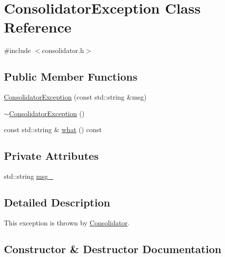 \hypertarget{classConsolidatorException}{}\section{Consolidator\+Exception Class Reference}
\label{classConsolidatorException}


{\ttfamily \#include $<$consolidator.\+h$>$}

\subsection*{Public Member Functions}
\begin{DoxyCompactItemize}
\item 
\hyperlink{classConsolidatorException_aeb4500538a2c9c0b477b8f95d4d2810f}{Consolidator\+Exception} (const std\+::string \&msg)
\item 
\hyperlink{classConsolidatorException_a1a50a013623fab20faf476e2176fc86f}{$\sim$\+Consolidator\+Exception} ()
\item 
const std\+::string \& \hyperlink{classConsolidatorException_a83d8bcbbdeb3a9facf80012f0cb6f0da}{what} () const 
\end{DoxyCompactItemize}
\subsection*{Private Attributes}
\begin{DoxyCompactItemize}
\item 
std\+::string \hyperlink{classConsolidatorException_a14ad835f359c30fd8e13f7c76c928a70}{msg\+\_\+}
\end{DoxyCompactItemize}


\subsection{Detailed Description}
This exception is thrown by \hyperlink{classConsolidator}{Consolidator}. 

\subsection{Constructor \& Destructor Documentation}
\hypertarget{classConsolidatorException_aeb4500538a2c9c0b477b8f95d4d2810f}{}
